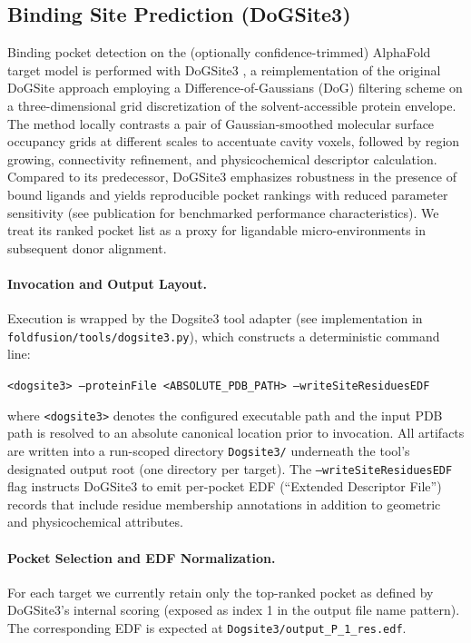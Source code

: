 \subsection{Binding Site Prediction (DoGSite3)}
Binding pocket detection on the (optionally confidence-trimmed) AlphaFold target model is performed with DoGSite3 \cite{graefBindingSiteDetection2023}, a reimplementation of the original DoGSite approach employing a Difference-of-Gaussians (DoG) filtering scheme on a three-dimensional grid discretization of the solvent-accessible protein envelope. The method locally contrasts a pair of Gaussian-smoothed molecular surface occupancy grids at different scales to accentuate cavity voxels, followed by region growing, connectivity refinement, and physicochemical descriptor calculation. Compared to its predecessor, DoGSite3 emphasizes robustness in the presence of bound ligands and yields reproducible pocket rankings with reduced parameter sensitivity (see publication for benchmarked performance characteristics). We treat its ranked pocket list as a proxy for ligandable micro-environments in subsequent donor alignment.

\paragraph{Invocation and Output Layout.} Execution is wrapped by the Dogsite3 tool adapter (see implementation in \texttt{foldfusion/tools/dogsite3.py}), which constructs a deterministic command line:
\begin{center}
    \texttt{<dogsite3> --proteinFile <ABSOLUTE\_PDB\_PATH> --writeSiteResiduesEDF}
\end{center}
where \texttt{<dogsite3>} denotes the configured executable path and the input PDB path is resolved to an absolute canonical location prior to invocation. All artifacts are written into a run-scoped directory \texttt{Dogsite3/} underneath the tool's designated output root (one directory per target). The \texttt{--writeSiteResiduesEDF} flag instructs DoGSite3 to emit per-pocket EDF (``Extended Descriptor File'') records that include residue membership annotations in addition to geometric and physicochemical attributes.

\paragraph{Pocket Selection and EDF Normalization.} For each target we currently retain only the top-ranked pocket as defined by DoGSite3's internal scoring (exposed as index 1 in the output file name pattern). The corresponding EDF is expected at \texttt{Dogsite3/output\_P\_1\_res.edf}.

